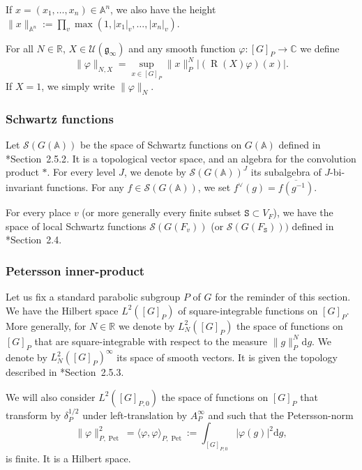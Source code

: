 \documentclass[letterpaper,11pt]{amsart}
\newcommand{\fg}{\mathfrak{g}}
\newcommand{\bA}{\mathbb{A}}
\newcommand{\C}{\mathbb{C}}
\newcommand{\R}{\mathbb{R}}
\newcommand{\cS}{\mathcal{S}}
\newcommand{\cU}{\mathcal{U}}
\newcommand{\rd}{\mathrm{d}}
\newcommand{\tS}{\mathtt{S}}
\newcommand{\<}{\negthickspace}
\providecommand{\aabs}[1]{\lVert#1\rVert}
\newcommand{\valP}[1]{\left|#1\right|}
\DeclareMathOperator{\rR}{R}
\DeclareMathOperator{\Pet}{Pet}
\theoremstyle{definition}
\theoremstyle{plain}
\theoremstyle{remark}
\numberwithin{equation}{section}
\begin{document}
If $x=(x_1,\hdots,x_n) \in \bA^n$, we also have the height $\aabs{x}_{\bA^n}:=\prod_v \max(1,\valP{x_1}_v,\hdots,\valP{x_n}_v)$.

For all $N \in \R$, $X \in \cU(\fg_\infty)$ and any smooth function $\varphi : [G]_P \to \C$ we define
\begin{equation*}
    \aabs{\varphi}_{N,X}=\sup_{x \in [G]_P} \aabs{x}_P^N \valP{(\rR(X)\varphi)(x)}.
\end{equation*}
If $X=1$, we simply write $\aabs{\varphi}_{N}$.


\subsubsection{Schwartz functions} Let $\cS(G(\bA))$ be the space of Schwartz functions on $G(\bA)$ defined in \cite{BPCZ}*{Section~2.5.2}. It is a topological vector space, and an algebra for the convolution product $*$. For every level $J$, we denote by $\cS(G(\bA))^J$ its subalgebra of $J$-bi-invariant functions. For any $f \in \cS(G(\bA))$, we set $ f^\vee(g)=\overline{f(g^{-1})}$.

For every place $v$ (or more generally every finite subset $\tS \subset V_F$), we have the space of local Schwartz functions $\cS(G(F_v))$ (or $\cS(G(F_\tS)))$ defined in \cite{BP}*{Section~2.4}.

\subsubsection{Petersson inner-product} 
\label{subsec:petersson_innter}

Let us fix a standard parabolic subgroup $P$ of $G$ for the reminder of this section. We have the Hilbert space $L^2([G]_P)$ of square-integrable functions on $[G]_P$. More generally, for $N \in \R$ we denote by $L^2_N([G]_P)$ the space of functions on $[G]_P$ that are square-integrable with respect to the measure $\aabs{g}_P^N \rd g$. We denote by $L^2_N([G]_{P})^\infty$ its space of smooth vectors. It is given the topology described in \cite{BPCZ}*{Section~2.5.3}.

We will also consider $L^2([G]_{P,0})$ the space of functions on $[G]_P$ that transform by $\delta_P^{1/2}$ under left-translation by $A_P^\infty$ and such that the Petersson-norm
\begin{equation*}
    \aabs{\varphi}_{P,\Pet}^2=\langle \varphi,\varphi \rangle_{P,\Pet}:=\int_{[G]_{P,0}} \valP{\varphi(g)}^2 \rd g,
\end{equation*}
is finite. It is a Hilbert space.
\end{document}
